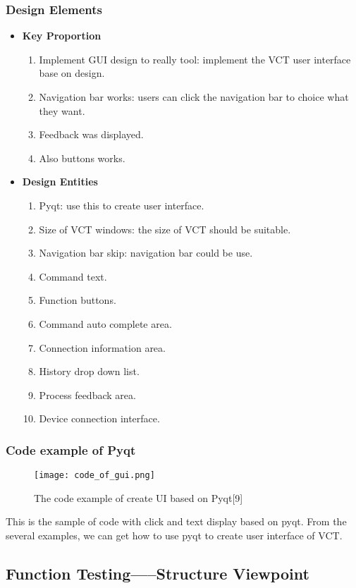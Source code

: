 \documentclass [10pt]{article}
\begin{document}
\subsubsection{Design Elements}
\begin{itemize}
\item \textbf{Key Proportion}
	\begin{enumerate}
	\item Implement GUI design to really tool: implement the VCT user interface base on design.
    \item Navigation bar works: users can click the navigation bar to choice what they want.
    \item Feedback was displayed.   
    \item Also buttons works.   
    \end{enumerate}
\item \textbf{Design Entities}
	\begin{enumerate}
    \item Pyqt: use this to create user interface.
    \item Size of VCT windows: the size of VCT should be suitable.
	\item Navigation bar skip: navigation bar could be use.
    \item Command text.
    \item Function buttons.
    \item Command auto complete area. 
    \item Connection information area.
    \item History drop down list.
    \item Process feedback area.
    \item Device connection interface.
    \end{enumerate}
\end{itemize}
\subsubsection{Code example of Pyqt}
\begin{figure}[ht]
\centering
\texttt{[image: code\_of\_gui.png]}
\caption{The code example of create UI based on Pyqt[9]}
\end{figure}
\newpage
This is the sample of code with click and text display based on pyqt. From the several examples, we can get how to use pyqt to create user interface of VCT. 

\subsection{Function Testing-----Structure Viewpoint}
\end{document}
